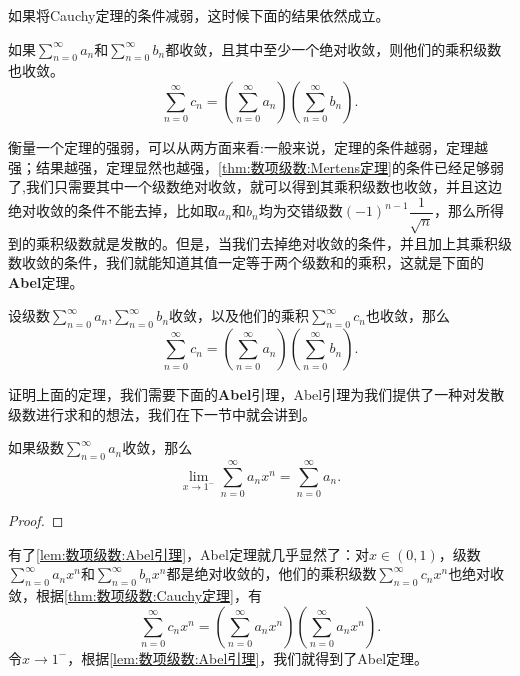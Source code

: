     如果将Cauchy定理的条件减弱，这时候下面的结果依然成立。
    \begin{theorem}[Mertens]\label{thm:数项级数:Mertens定理}
        如果\(\sum\limits_{n=0}^{\infty}a_n\)和\(\sum\limits_{n=0}^{\infty}b_n\)都收敛，且其中至少一个绝对收敛，则他们的乘积级数也收敛。\[\sum_{n=0}^{\infty}c_n=\left(\sum_{n=0}^{\infty}a_n\right)\left(\sum_{n=0}^{\infty}b_n\right).\]
    \end{theorem}

    衡量一个定理的强弱，可以从两方面来看:一般来说，定理的条件越弱，定理越强；结果越强，定理显然也越强，\enspace \autoref{thm:数项级数:Mertens定理}的条件已经足够弱了,我们只需要其中一个级数绝对收敛，就可以得到其乘积级数也收敛，并且这边绝对收敛的条件不能去掉，比如取\(a_n\)和\(b_n\)均为交错级数\((-1)^{n-1}\dfrac{1}{\sqrt{n}}\)，那么所得到的乘积级数就是发散的。但是，当我们去掉绝对收敛的条件，并且加上其乘积级数收敛的条件，我们就能知道其值一定等于两个级数和的乘积，这就是下面的{\heiti \textbf{Abel}定理}。

    \begin{theorem}[Abel定理]
        设级数\(\sum\limits_{n=0}^{\infty}a_n\),\enspace \(\sum\limits_{n=0}^{\infty}b_n\)收敛，以及他们的乘积\(\sum\limits_{n=0}^{\infty}c_n\)也收敛，那么\[\sum_{n=0}^{\infty}c_n = \left(\sum_{n = 0}^{\infty}a_n\right)\left(\sum_{n = 0}^{\infty}b_n\right).\]
    \end{theorem}

    证明上面的定理，我们需要下面的\textbf{Abel}{\heiti 引理}，Abel引理为我们提供了一种对发散级数进行求和的想法，我们在下一节中就会讲到。

    \begin{lemma}[Abel引理]\label{lem:数项级数:Abel引理}
        如果级数\(\sum\limits_{n=0}^{\infty}a_n\)收敛，那么\[\lim_{x\to 1^-}\sum_{n=0}^{\infty}a_nx^n = \sum_{n=0}^{\infty}a_n.\]
    \end{lemma}
    \begin{proof}
        
    \end{proof}

    有了\autoref{lem:数项级数:Abel引理}，\enspace Abel定理就几乎显然了：对\(x\in(0,1)\)，级数\(\sum\limits_{n=0}^{\infty}a_nx^n\)和\(\sum\limits_{n=0}^{\infty}b_nx^n\)都是绝对收敛的，他们的乘积级数\(\sum\limits_{n=0}^{\infty}c_nx^n\)也绝对收敛，根据\autoref{thm:数项级数:Cauchy定理}，有\[\sum_{n=0}^{\infty}c_nx^n=\left(\sum_{n=0}^{\infty}a_nx^n\right)\left(\sum_{n=0}^{\infty}a_nx^n\right).\]
    令\(x\to1^-\)，根据\autoref{lem:数项级数:Abel引理}，我们就得到了Abel定理。

